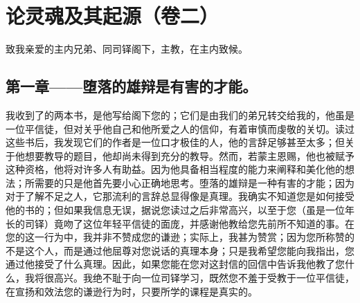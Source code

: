 

\section{论灵魂及其起源（卷二）}

\par

\par

致我亲爱的主内兄弟、同司铎阁下，主教，在主内致候。\par


\subsection{第一章——堕落的雄辩是有害的才能。}

我收到了的两本书，是他写给阁下您的；它们是由我们的弟兄转交给我的，他虽是一位平信徒，但对关乎他自己和他所爱之人的信仰，有着审慎而虔敬的关切。读过这些书后，我发现它们的作者是一位口才极佳的人，他的言辞足够甚至太多；但关于他想要教导的题目，他却尚未得到充分的教导。然而，若蒙主恩赐，他也被赋予这种资格，他将对许多人有助益。因为他具备相当程度的能力来阐释和美化他的想法；所需要的只是他首先要小心正确地思考。堕落的雄辩是一种有害的才能；因为对于了解不足之人，它那流利的言辞总显得像是真理。我确实不知道您是如何接受他的书的；但如果我信息无误，据说您读过之后非常高兴，以至于您（虽是一位年长的司铎）竟吻了这位年轻平信徒的面庞，并感谢他教给您先前所不知道的事。在您的这一行为中，我并非不赞成您的谦逊；实际上，我甚为赞赏；因为您所称赞的不是这个人，而是通过他屈尊对您说话的真理本身；只是我希望您能向我指出，您通过他接受了什么真理。因此，如果您能在您对这封信的回信中告诉我他教了您什么，我将很高兴。我绝不耻于向一位司铎学习，既然您不羞于受教于一位平信徒，在宣扬和效法您的谦逊行为时，只要所学的课程是真实的。\par

